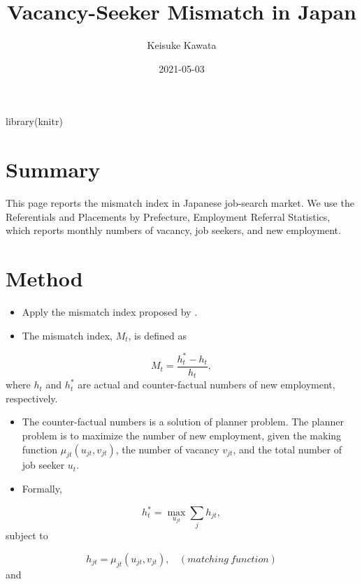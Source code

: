 \documentclass[
]{book}
\title{Vacancy-Seeker Mismatch in Japan}
\author{Keisuke Kawata}
\date{2021-05-03}
\newenvironment{Shaded}{\begin{snugshade}}{\end{snugshade}}
\newcommand{\FunctionTok}[1]{\textcolor[rgb]{0.00,0.00,0.00}{#1}}
\newcommand{\NormalTok}[1]{#1}
\begin{document}
\maketitle

{
\setcounter{tocdepth}{1}
\tableofcontents
}
\begin{Shaded}
\begin{Highlighting}[]
\FunctionTok{library}\NormalTok{(knitr)}
\end{Highlighting}
\end{Shaded}

\hypertarget{summary}{%
\chapter{Summary}\label{summary}}

This page reports the mismatch index \citep{csahin2014mismatch} in Japanese job-search market.
We use the Referentials and Placements by Prefecture, Employment Referral Statistics, which reports monthly numbers of vacancy, job seekers, and new employment.

\hypertarget{intro}{%
\chapter{Method}\label{intro}}

\begin{itemize}
\item
  Apply the mismatch index proposed by \citet{csahin2014mismatch}.
\item
  The mismatch index, \(M_t\), is defined as
\end{itemize}

\[M_t = \frac{h_t^{*}-h_t}{h_t},\]
where \(h_t\) and \(h_t^*\) are actual and counter-factual numbers of new employment, respectively.

\begin{itemize}
\item
  The counter-factual numbers is a solution of planner problem.
  The planner problem is to maximize the number of new employment, given the making function \(\mu_{jt}(u_{jt},v_{jt})\), the number of vacancy \(v_{jt}\), and the total number of job seeker \(u_{t}\).
\item
  Formally,
\end{itemize}

\[h_t^*=\max_{u_{jt}} \sum_j h_{jt},\]
subject to

\[h_{jt}=\mu_{jt}(u_{jt},v_{jt}),\ \ \ \ (matching\ function)\]
and
\end{document}
